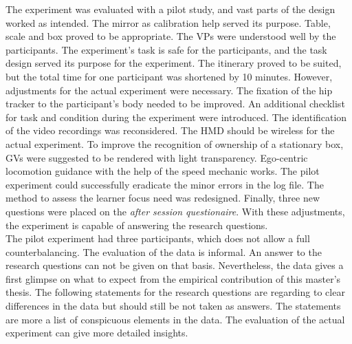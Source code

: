 The experiment was evaluated with a pilot study, and vast parts of the design worked as intended. The mirror as calibration help served its purpose. Table, scale and box proved to be appropriate. The VPs were understood well by the participants. The experiment's task is safe for the participants, and the task design served its purpose for the experiment. The itinerary proved to be suited, but the total time for one participant was shortened by 10 minutes. However, adjustments for the actual experiment were necessary. The fixation of the hip tracker to the participant's body needed to be improved. An additional checklist for task and condition during the experiment were introduced. The identification of the video recordings was reconsidered. The HMD should be wireless for the actual experiment. To improve the recognition of ownership of a stationary box, GVs were suggested to be rendered with light transparency. Ego-centric locomotion guidance with the help of the speed mechanic works. The pilot experiment could successfully eradicate the minor errors in the log file. The method to assess the learner focus need was redesigned. Finally, three new questions were placed on the \textit{after session questionaire}. With these adjustments, the experiment is capable of answering the research questions.\\

The pilot experiment had three participants, which does not allow a full counterbalancing. The evaluation of the data is informal. An answer to the research questions can not be given on that basis. Nevertheless, the data gives a first glimpse on what to expect from the empirical contribution of this master's thesis. The following statements for the research questions are regarding to clear differences in the data but should still be not taken as answers. The statements are more a list of conspicuous elements in the data. The evaluation of the actual experiment can give more detailed insights.

